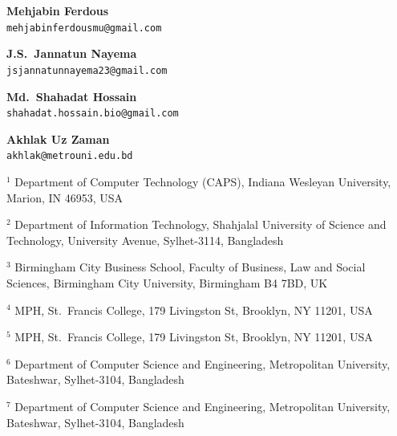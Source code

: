 \documentclass[11pt,a4paper]{article}
\begin{document}
\noindent
\textbf{Mehjabin Ferdous} \\
\texttt{mehjabinferdousmu@gmail.com}

\noindent
\textbf{J.S.\ Jannatun Nayema} \\
\texttt{jsjannatunnayema23@gmail.com}

\noindent
\textbf{Md.\ Shahadat Hossain} \\
\texttt{shahadat.hossain.bio@gmail.com}

\noindent
\textbf{Akhlak Uz Zaman} \\
\texttt{akhlak@metrouni.edu.bd}

\bigskip
\noindent
$^{1}$ Department of Computer Technology (CAPS), Indiana Wesleyan University,
Marion, IN 46953, USA

\noindent
$^{2}$ Department of Information Technology, Shahjalal University of Science
and Technology, University Avenue, Sylhet-3114, Bangladesh

\noindent
$^{3}$ Birmingham City Business School, Faculty of Business, Law and Social
Sciences, Birmingham City University, Birmingham B4 7BD, UK

\noindent
$^{4}$ MPH, St.\ Francis College, 179 Livingston St, Brooklyn, NY 11201, USA

\noindent
$^{5}$ MPH, St.\ Francis College, 179 Livingston St, Brooklyn, NY 11201, USA

\noindent
$^{6}$ Department of Computer Science and Engineering, Metropolitan
University, Bateshwar, Sylhet-3104, Bangladesh

\noindent
$^{7}$ Department of Computer Science and Engineering, Metropolitan
University, Bateshwar, Sylhet-3104, Bangladesh
\end{document}
